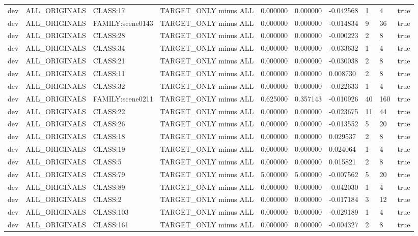 \begin{tabular}{llllllllll}
dev & ALL\_ORIGINALS & CLASS:17 & TARGET\_ONLY minus ALL & 0.000000 & 0.000000 & -0.042568 & 1 & 4 & true \\
dev & ALL\_ORIGINALS & FAMILY:scene0143 & TARGET\_ONLY minus ALL & 0.000000 & 0.000000 & -0.014834 & 9 & 36 & true \\
dev & ALL\_ORIGINALS & CLASS:28 & TARGET\_ONLY minus ALL & 0.000000 & 0.000000 & -0.000223 & 2 & 8 & true \\
dev & ALL\_ORIGINALS & CLASS:34 & TARGET\_ONLY minus ALL & 0.000000 & 0.000000 & -0.033632 & 1 & 4 & true \\
dev & ALL\_ORIGINALS & CLASS:21 & TARGET\_ONLY minus ALL & 0.000000 & 0.000000 & -0.030038 & 2 & 8 & true \\
dev & ALL\_ORIGINALS & CLASS:11 & TARGET\_ONLY minus ALL & 0.000000 & 0.000000 & 0.008730 & 2 & 8 & true \\
dev & ALL\_ORIGINALS & CLASS:32 & TARGET\_ONLY minus ALL & 0.000000 & 0.000000 & -0.022633 & 1 & 4 & true \\
dev & ALL\_ORIGINALS & FAMILY:scene0211 & TARGET\_ONLY minus ALL & 0.625000 & 0.357143 & -0.010926 & 40 & 160 & true \\
dev & ALL\_ORIGINALS & CLASS:22 & TARGET\_ONLY minus ALL & 0.000000 & 0.000000 & -0.023675 & 11 & 44 & true \\
dev & ALL\_ORIGINALS & CLASS:26 & TARGET\_ONLY minus ALL & 0.000000 & 0.000000 & -0.013552 & 5 & 20 & true \\
dev & ALL\_ORIGINALS & CLASS:18 & TARGET\_ONLY minus ALL & 0.000000 & 0.000000 & 0.029537 & 2 & 8 & true \\
dev & ALL\_ORIGINALS & CLASS:19 & TARGET\_ONLY minus ALL & 0.000000 & 0.000000 & 0.024064 & 1 & 4 & true \\
dev & ALL\_ORIGINALS & CLASS:5 & TARGET\_ONLY minus ALL & 0.000000 & 0.000000 & 0.015821 & 2 & 8 & true \\
dev & ALL\_ORIGINALS & CLASS:79 & TARGET\_ONLY minus ALL & 5.000000 & 5.000000 & -0.007562 & 5 & 20 & true \\
dev & ALL\_ORIGINALS & CLASS:89 & TARGET\_ONLY minus ALL & 0.000000 & 0.000000 & -0.042030 & 1 & 4 & true \\
dev & ALL\_ORIGINALS & CLASS:2 & TARGET\_ONLY minus ALL & 0.000000 & 0.000000 & -0.017184 & 3 & 12 & true \\
dev & ALL\_ORIGINALS & CLASS:103 & TARGET\_ONLY minus ALL & 0.000000 & 0.000000 & -0.029189 & 1 & 4 & true \\
dev & ALL\_ORIGINALS & CLASS:161 & TARGET\_ONLY minus ALL & 0.000000 & 0.000000 & -0.004327 & 2 & 8 & true \\

\end{tabular}
